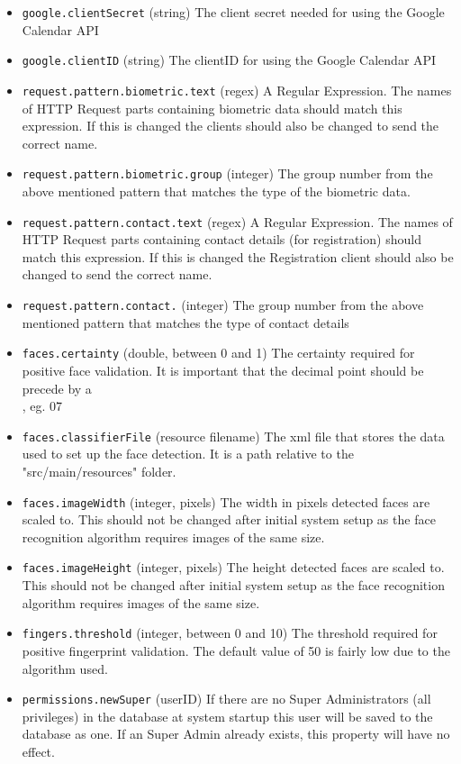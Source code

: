 \begin{itemize}
\item \verb!google.clientSecret! (string) The client secret needed for using the Google Calendar API
\item \verb!google.clientID! (string) The clientID for using the Google Calendar API

\item \verb!request.pattern.biometric.text! (regex) A Regular Expression. The names of HTTP Request parts containing biometric data should match this expression. If this is changed the clients should also be changed to send the correct name.
\item \verb!request.pattern.biometric.group! (integer) The group number from the above mentioned pattern that matches the type of the biometric data.
\item \verb!request.pattern.contact.text! (regex) A Regular Expression. The names of HTTP Request parts containing contact details (for registration) should match this expression. If this is changed the Registration client should also be changed to send the correct name.
\item \verb!request.pattern.contact.! (integer) The group number from the above mentioned pattern that matches the type of contact details

\item \verb!faces.certainty! (double, between 0 and 1) The certainty required for positive face validation. It is important that the decimal point should be precede by a \\, eg. 0\.7 
\item \verb!faces.classifierFile! (resource filename) The xml file that stores the data used to set up the face detection. It is a path relative to the "src/main/resources" folder. 
\item \verb!faces.imageWidth! (integer, pixels) The width in pixels detected faces are scaled to. This should not be changed after initial system setup as the face recognition algorithm requires images of the same size.
\item \verb!faces.imageHeight! (integer, pixels) The height detected faces are scaled to. This should not be changed after initial system setup as the face recognition algorithm requires images of the same size.

\item \verb!fingers.threshold! (integer, between 0 and 10) The threshold required for positive fingerprint validation. The default value of 50 is fairly low due to the algorithm used.
\item \verb!permissions.newSuper! (userID) If there are no Super Administrators (all privileges) in the database at system startup this user will be saved to the database as one. If an Super Admin already exists, this property will have no effect. 


\end{itemize}

